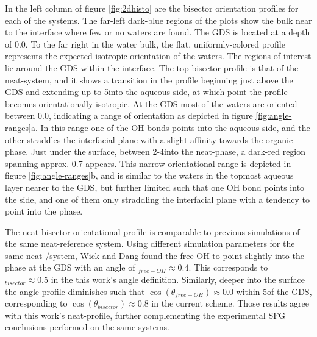 In the left column of figure \ref{fig:2dhisto} are the bisector orientation profiles for each of the systems. The far-left dark-blue regions of the plots show the \ctc bulk near to the interface where few or no waters are found. The GDS is located at a depth of 0.0\angs. To the far right in the water bulk, the flat, uniformly-colored profile represents the expected isotropic orientation of the waters. The regions of interest lie around the GDS within the interface. The top bisector profile is that of the neat-\wat system, and it shows a transition in the profile beginning just above the GDS and extending up to 5\angs into the aqueous side, at which point the profile becomes orientationally isotropic. At the GDS most of the waters are oriented between 0.0, indicating a range of orientation as depicted in figure \ref{fig:angle-ranges}a. In this range one of the OH-bonds points into the aqueous side, and the other straddles the interfacial plane with a slight affinity towards the organic \ctc phase. Just under the surface, between 2-4\angs into the neat-\wat phase, a dark-red region spanning approx. 0.7 appears. This narrow orientational range is depicted in figure \ref{fig:angle-ranges}b, and is similar to the waters in the topmost aqueous layer nearer to the GDS, but further limited such that one OH bond points into the \wat side, and one of them only straddling the interfacial plane with a tendency to point into the \wat phase.

The neat-\wat bisector orientational profile is comparable to previous simulations of the same neat-\wat reference system. Using different simulation parameters for the same neat-\wat/\ctc system, Wick and Dang found the free-OH to point slightly into the \ctc phase at the GDS with an angle of \costheta$_{free-OH}\approx 0.4$. This corresponds to \costheta$_{bisector} \approx 0.5$ in the this work's angle definition. Similarly, deeper into the surface the angle profile diminishes such that $\cos(\theta_{free-OH})\approx 0.0$ within 5\angs of the GDS, corresponding to $\cos(\theta_{bisector})\approx 0.8$ in the current scheme. Those results agree with this work's neat-\wat profile, further complementing the experimental SFG conclusions performed on the same systems.\cite{McFearin2009,Scatena2001}


